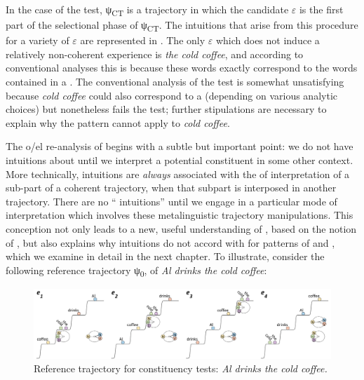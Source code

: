   In the case of the  test, ψ\textsubscript{CT} is a trajectory in which the candidate $\varepsilon $ is the first part of the selectional phase of ψ\textsubscript{CT}. The  intuitions that arise from this procedure for a variety of $\varepsilon $ are represented in . The only $\varepsilon $ which does not induce a relatively non-coherent experience is \textit{the cold coffee}, and according to conventional analyses this is because these words exactly correspond to the words contained in a . The conventional analysis of the  test is somewhat unsatisfying because \textit{cold coffee} could also correspond to a  (depending on various analytic choices) but nonetheless fails the test; further stipulations are necessary to explain why the  pattern cannot apply to \textit{cold coffee}.

\ea\label{ex:6:22}
  \z
\z

  The o/el re-analysis of  begins with a subtle but important point: we do not have intuitions about  until we interpret a potential constituent in some other context. More technically,  intuitions are \textit{always} associated with the  of interpretation of a sub-part of a coherent trajectory, when that subpart is interposed in another trajectory. There are no “ intuitions” until we engage in a particular mode of interpretation which involves these metalinguistic trajectory manipulations. This conception not only leads to a new, useful understanding of , based on the notion of , but also explains why  intuitions do not accord with  for patterns of  and , which we examine in detail in the next chapter. To illustrate, consider the following reference trajectory ψ\textsubscript{0}, of \textit{Al drinks the cold coffee}:

  
\begin{figure}
\includegraphics[width=\textwidth]{figures/Tilsen-img137.png}
\caption{Reference trajectory for constituency tests: \textit{Al drinks the cold coffee.}}
\label{fig:6:18}
\end{figure}
  

